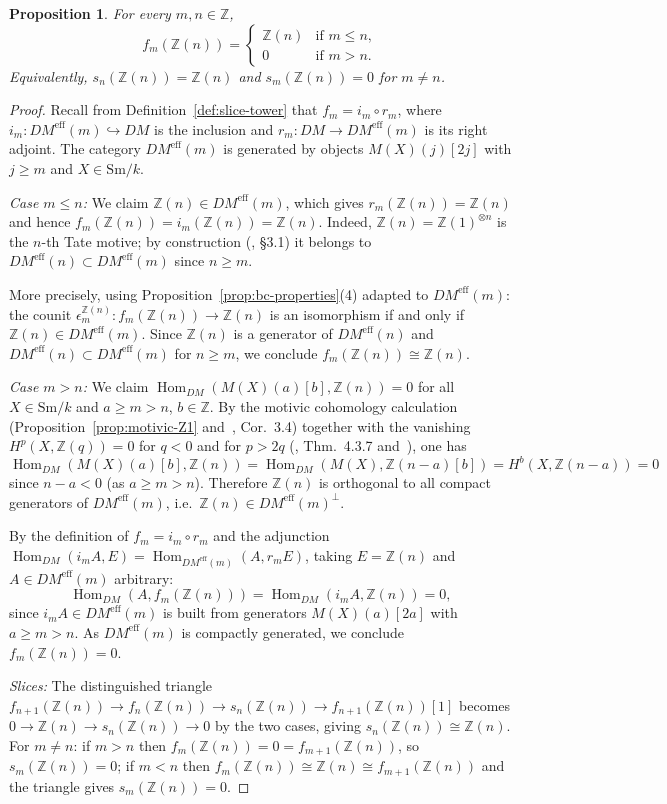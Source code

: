 \documentclass[12pt,a4paper]{article}
\newtheorem{proposition}[theorem]{Proposition}
\theoremstyle{definition}
\newcommand{\Sm}{\mathrm{Sm}}
\newcommand{\Hom}{\operatorname{Hom}}
\newcommand{\Z}{\mathbb{Z}}
\begin{document}
\begin{proposition}\label{prop:slice-Z}
For every $m,n\in\Z$,
\[
  f_m(\Z(n)) =
  \begin{cases}
    \Z(n) & \text{if } m\leq n,\\
    0     & \text{if } m>n.
  \end{cases}
\]
Equivalently, $s_n(\Z(n))=\Z(n)$ and $s_m(\Z(n))=0$ for $m\neq n$.
\end{proposition}
\begin{proof}
Recall from Definition~\ref{def:slice-tower} that $f_m = i_m\circ r_m$, where
$i_m:DM^{\mathrm{eff}}(m)\hookrightarrow DM$ is the inclusion and $r_m:DM\to
DM^{\mathrm{eff}}(m)$ is its right adjoint.  The category $DM^{\mathrm{eff}}(m)$ is
generated by objects $M(X)(j)[2j]$ with $j\geq m$ and $X\in\Sm/k$.

\textit{Case $m\leq n$:} We claim $\Z(n)\in DM^{\mathrm{eff}}(m)$, which gives
$r_m(\Z(n))=\Z(n)$ and hence $f_m(\Z(n))=i_m(\Z(n))=\Z(n)$.  Indeed,
$\Z(n)=\Z(1)^{\otimes n}$ is the $n$-th Tate motive; by construction
(\cite{VSF00}, \S3.1) it belongs to $DM^{\mathrm{eff}}(n)\subset DM^{\mathrm{eff}}(m)$
since $n\geq m$.

More precisely, using Proposition~\ref{prop:bc-properties}(4) adapted to
$DM^{\mathrm{eff}}(m)$: the counit $\epsilon_m^{\Z(n)}:f_m(\Z(n))\to\Z(n)$ is an
isomorphism if and only if $\Z(n)\in DM^{\mathrm{eff}}(m)$.  Since $\Z(n)$ is a
generator of $DM^{\mathrm{eff}}(n)$ and $DM^{\mathrm{eff}}(n)\subset DM^{\mathrm{eff}}(m)$
for $n\geq m$, we conclude $f_m(\Z(n))\cong\Z(n)$.

\textit{Case $m>n$:} We claim $\Hom_{DM}(M(X)(a)[b],\Z(n))=0$ for all $X\in\Sm/k$
and $a\geq m>n$, $b\in\Z$.  By the motivic cohomology calculation
(Proposition~\ref{prop:motivic-Z1} and~\cite{VSF00}, Cor.\ 3.4) together with
the vanishing $H^p(X,\Z(q))=0$ for $q<0$ and for $p>2q$ (\cite{VSF00}, Thm.\ 4.3.7
and~\cite{Voe02b}), one has
\[
  \Hom_{DM}(M(X)(a)[b],\Z(n))
  = \Hom_{DM}(M(X),\Z(n-a)[b])
  = H^b(X,\Z(n-a))
  = 0
\]
since $n-a < 0$ (as $a\geq m>n$).  Therefore $\Z(n)$ is orthogonal to all compact
generators of $DM^{\mathrm{eff}}(m)$, i.e.\ $\Z(n)\in DM^{\mathrm{eff}}(m)^\perp$.

By the definition of $f_m=i_m\circ r_m$ and the adjunction
$\Hom_{DM}(i_mA,E)=\Hom_{DM^{\mathrm{eff}}(m)}(A,r_mE)$, taking $E=\Z(n)$ and
$A\in DM^{\mathrm{eff}}(m)$ arbitrary:
\[
  \Hom_{DM}(A,f_m(\Z(n)))
  = \Hom_{DM}(i_mA,\Z(n))
  = 0,
\]
since $i_mA\in DM^{\mathrm{eff}}(m)$ is built from generators $M(X)(a)[2a]$ with
$a\geq m>n$.  As $DM^{\mathrm{eff}}(m)$ is compactly generated, we conclude
$f_m(\Z(n))=0$.

\textit{Slices:} The distinguished triangle
$f_{n+1}(\Z(n))\to f_n(\Z(n))\to s_n(\Z(n))\to f_{n+1}(\Z(n))[1]$ becomes
$0\to\Z(n)\to s_n(\Z(n))\to 0$ by the two cases, giving $s_n(\Z(n))\cong\Z(n)$.
For $m\neq n$: if $m>n$ then $f_m(\Z(n))=0=f_{m+1}(\Z(n))$, so $s_m(\Z(n))=0$;
if $m<n$ then $f_m(\Z(n))\cong\Z(n)\cong f_{m+1}(\Z(n))$ and the triangle gives
$s_m(\Z(n))=0$.
\end{proof}
\end{document}
